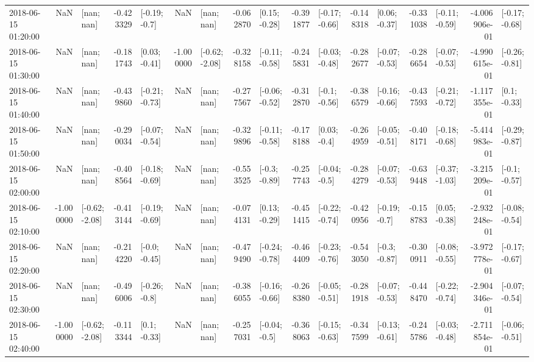 \begin{tabular}{lrlrlrlrlrlrlrlrl}
2018-06-15 01:20:00 &       NaN &      [nan; nan] & -0.423329 &   [-0.19; -0.7] &       NaN &      [nan; nan] & -0.062870 &   [0.15; -0.28] & -0.391877 &  [-0.17; -0.66] & -0.148318 &   [0.06; -0.37] & -0.331038 &  [-0.11; -0.59] & -4.006906e-01 &  [-0.17; -0.68] \\
2018-06-15 01:30:00 &       NaN &      [nan; nan] & -0.181743 &   [0.03; -0.41] & -1.000000 &  [-0.62; -2.08] & -0.328158 &  [-0.11; -0.58] & -0.245831 &  [-0.03; -0.48] & -0.282677 &  [-0.07; -0.53] & -0.286654 &  [-0.07; -0.53] & -4.990615e-01 &  [-0.26; -0.81] \\
2018-06-15 01:40:00 &       NaN &      [nan; nan] & -0.439860 &  [-0.21; -0.73] &       NaN &      [nan; nan] & -0.277567 &  [-0.06; -0.52] & -0.312870 &   [-0.1; -0.56] & -0.386579 &  [-0.16; -0.66] & -0.437593 &  [-0.21; -0.72] & -1.117355e-01 &    [0.1; -0.33] \\
2018-06-15 01:50:00 &       NaN &      [nan; nan] & -0.290034 &  [-0.07; -0.54] &       NaN &      [nan; nan] & -0.329896 &  [-0.11; -0.58] & -0.178188 &    [0.03; -0.4] & -0.264959 &  [-0.05; -0.51] & -0.408171 &  [-0.18; -0.68] & -5.414983e-01 &  [-0.29; -0.87] \\
2018-06-15 02:00:00 &       NaN &      [nan; nan] & -0.408564 &  [-0.18; -0.69] &       NaN &      [nan; nan] & -0.553525 &   [-0.3; -0.89] & -0.257743 &   [-0.04; -0.5] & -0.284279 &  [-0.07; -0.53] & -0.639448 &  [-0.37; -1.03] & -3.215209e-01 &   [-0.1; -0.57] \\
2018-06-15 02:10:00 & -1.000000 &  [-0.62; -2.08] & -0.413144 &  [-0.19; -0.69] &       NaN &      [nan; nan] & -0.074131 &   [0.13; -0.29] & -0.451415 &  [-0.22; -0.74] & -0.420956 &   [-0.19; -0.7] & -0.158783 &   [0.05; -0.38] & -2.932248e-01 &  [-0.08; -0.54] \\
2018-06-15 02:20:00 &       NaN &      [nan; nan] & -0.214220 &   [-0.0; -0.45] &       NaN &      [nan; nan] & -0.479490 &  [-0.24; -0.78] & -0.464409 &  [-0.23; -0.76] & -0.543050 &   [-0.3; -0.87] & -0.300911 &  [-0.08; -0.55] & -3.972778e-01 &  [-0.17; -0.67] \\
2018-06-15 02:30:00 &       NaN &      [nan; nan] & -0.496006 &   [-0.26; -0.8] &       NaN &      [nan; nan] & -0.386055 &  [-0.16; -0.66] & -0.268380 &  [-0.05; -0.51] & -0.281918 &  [-0.07; -0.53] & -0.448470 &  [-0.22; -0.74] & -2.904346e-01 &  [-0.07; -0.54] \\
2018-06-15 02:40:00 & -1.000000 &  [-0.62; -2.08] & -0.113344 &    [0.1; -0.33] &       NaN &      [nan; nan] & -0.257031 &   [-0.04; -0.5] & -0.368063 &  [-0.15; -0.63] & -0.347599 &  [-0.13; -0.61] & -0.245786 &  [-0.03; -0.48] & -2.711854e-01 &  [-0.06; -0.51] \\

\end{tabular}
